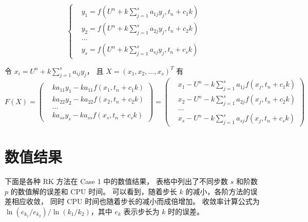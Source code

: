 \documentclass[a4paper]{article}
\begin{document}
\begin{equation}
    \left\{
        \begin{aligned}
            &y_{1} = f\left(U^n + k \sum_{j=1}^{s} a_{1j} y_j,t_n + c_1 k\right) \\
            &y_{2} = f\left(U^n + k \sum_{j=1}^{s} a_{2j} y_j,t_n + c_2 k\right) \\
            &\ldots \\
            &y_{s} = f\left(U^n + k \sum_{j=1}^{s} a_{sj} y_j,t_n + c_s k\right)
        \end{aligned}
    \right.
\end{equation}
\par 令 $x_i = U^n + k \sum_{j=1}^{s} a_{ij} y_j$，
且 $X = (x_1, x_2, \ldots, x_s)^T$ 有
\begin{equation}
    F(X) = \left(
        \begin{aligned}
            &ka_{11}y_1 - ka_{11}f\left(x_1,t_n + c_1 k\right) \\
            &ka_{22}y_2 - ka_{22}f\left(x_2,t_n + c_2 k\right) \\
            &\ldots \\
            &ka_{ss}y_s - ka_{ss}f\left(x_s,t_n + c_s k\right)
        \end{aligned}
    \right)
    = \left(
        \begin{aligned}
            &x_1 - U^n - k \sum_{j=1}^{s} a_{1j} f\left(x_j,t_n + c_1 k\right) \\
            &x_2 - U^n - k \sum_{j=1}^{s} a_{2j} f\left(x_j,t_n + c_2 k\right) \\
            &\ldots \\
            &x_s - U^n - k \sum_{j=1}^{s} a_{sj} f\left(x_j,t_n + c_s k\right)
        \end{aligned}
    \right)
\end{equation}

\section{数值结果}


\par 下面是各种 RK 方法在 Case 1 中的数值结果，
表格中列出了不同步数 $s$ 和阶数 $p$ 的数值解的误差和 CPU 时间。
可以看到，随着步长 $k$ 的减小，各阶方法的误差相应收敛，
同时 CPU 时间也随着步长的减小而成倍增加。
收敛率计算公式为 $\ln\left(e_{k_1}/{e_{k_2}}\right)/\ln(k_1/k_2)$，其中 $e_k$ 表示步长为 $k$ 时的误差。
\end{document}
